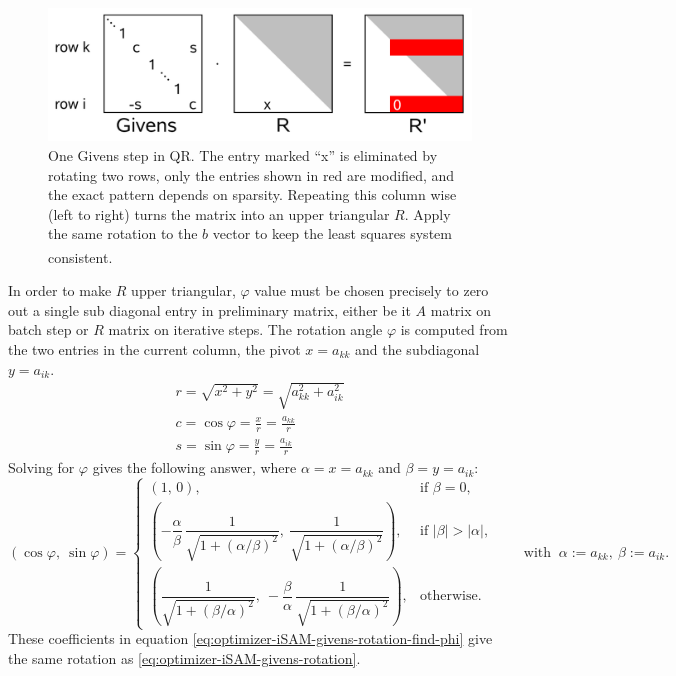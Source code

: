 \begin{figure}[H]
    \centering
    \includegraphics[width=0.9\linewidth]{Pictures/Optimizers/iSAM/Givens_Rotations.png}
    \caption{One Givens step in QR. The entry marked ``x'' is eliminated by rotating two rows, only the entries shown in red are modified, and the exact pattern depends on sparsity. Repeating this column wise (left to right) turns the matrix into an upper triangular $R$. Apply the same rotation to the $b$ vector to keep the least squares system consistent.\textsuperscript{\cite{iSAM_paper}}}
    \label{fig:givens-rotation}
\end{figure}
\noindent
In order to make $R$ upper triangular, $\varphi$ value must be chosen precisely to zero out a single sub diagonal entry in preliminary matrix, either be it $A$ matrix on batch step or $R$ matrix on iterative steps. The rotation angle $\varphi$ is computed from the two entries in the current column, the pivot $x=a_{kk}$ and the subdiagonal $y=a_{ik}$.
$$
    \begin{aligned}
        r=\sqrt{x^2+y^2}=\sqrt{a_{kk}^2+a_{ik}^2} \\
        c=\cos\varphi=\frac{x}{r}=\frac{a_{kk}}{r} \\
        s=\sin\varphi=\frac{y}{r}=\frac{a_{ik}}{r} 
    \end{aligned}
$$
Solving for $\varphi$ gives the following answer, where $\alpha = x = a_{kk}$ and $\beta = y = a_{ik}$:
\begin{equation}
    (\cos\varphi,\ \sin\varphi)=
    \begin{cases}
    (1,\,0), & \text{if }\beta=0,\\[6pt]
    \left(-\dfrac{\alpha}{\beta}\,\dfrac{1}{\sqrt{1+(\alpha/\beta)^2}},\ \dfrac{1}{\sqrt{1+(\alpha/\beta)^2}}\right), & \text{if }|\beta|>|\alpha|,\\[10pt]
    \left(\dfrac{1}{\sqrt{1+(\beta/\alpha)^2}},\ -\dfrac{\beta}{\alpha}\,\dfrac{1}{\sqrt{1+(\beta/\alpha)^2}}\right), & \text{otherwise.}
    \end{cases}
    \qquad\text{with }\ \alpha:=a_{kk},\ \beta:=a_{ik}.
    \label{eq:optimizer-iSAM-givens-rotation-find-phi}
\end{equation}
These coefficients in equation \eqref{eq:optimizer-iSAM-givens-rotation-find-phi} give the same rotation as \eqref{eq:optimizer-iSAM-givens-rotation}. 

